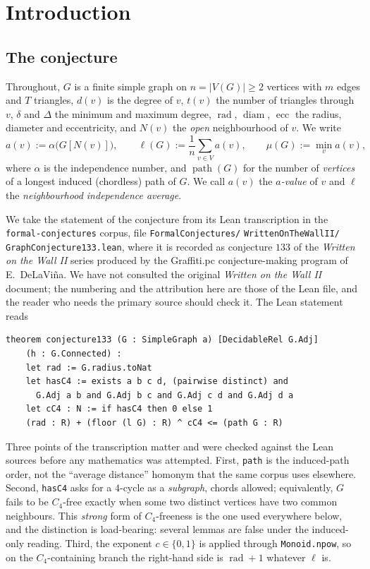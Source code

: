 \documentclass[11pt]{article}
\theoremstyle{plain}
\theoremstyle{definition}
\theoremstyle{remark}
\numberwithin{equation}{section}
\newcommand{\rad}{\operatorname{rad}}
\newcommand{\ecc}{\operatorname{ecc}}
\newcommand{\diam}{\operatorname{diam}}
\newcommand{\pth}{\operatorname{path}}
\begin{document}
\section{Introduction}\label{sec:intro}

\subsection{The conjecture}

Throughout, $G$ is a finite simple graph on $n = |V(G)| \ge 2$ vertices with $m$ edges and
$T$ triangles, $d(v)$ is the degree of $v$, $t(v)$ the number of triangles through $v$,
$\delta$ and $\Delta$ the minimum and maximum degree, $\rad$, $\diam$, $\ecc$ the radius,
diameter and eccentricity, and $N(v)$ the \emph{open} neighbourhood of $v$. We write
\[
  a(v) := \alpha\bigl(G[N(v)]\bigr), \qquad
  \ell(G) := \frac1n \sum_{v \in V} a(v), \qquad
  \mu(G) := \min_{v} a(v),
\]
where $\alpha$ is the independence number, and $\pth(G)$ for the number of \emph{vertices} of
a longest induced (chordless) path of $G$. We call $a(v)$ the \emph{$a$-value} of $v$ and
$\ell$ the \emph{neighbourhood independence average}.

We take the statement of the conjecture from its Lean transcription in the
\texttt{formal-conjectures} corpus, file
\texttt{FormalConjectures/} \texttt{WrittenOnTheWallII/} \texttt{GraphConjecture133.lean},
where it is recorded as conjecture $133$ of the \emph{Written on the Wall II} series produced by the Graffiti.pc
conjecture-making program of E.~DeLaVi\~na. We have not consulted the original \emph{Written
on the Wall II} document; the numbering and the attribution here are those of the Lean file,
and the reader who needs the primary source should check it. The Lean statement reads

\begin{verbatim}
theorem conjecture133 (G : SimpleGraph a) [DecidableRel G.Adj]
    (h : G.Connected) :
    let rad := G.radius.toNat
    let hasC4 := exists a b c d, (pairwise distinct) and
      G.Adj a b and G.Adj b c and G.Adj c d and G.Adj d a
    let cC4 : N := if hasC4 then 0 else 1
    (rad : R) + (floor (l G) : R) ^ cC4 <= (path G : R)
\end{verbatim}

Three points of the transcription matter and were checked against the Lean sources before any
mathematics was attempted. First, \texttt{path} is the induced-path order, not the
``average distance'' homonym that the same corpus uses elsewhere. Second, \texttt{hasC4} asks
for a $4$-cycle as a \emph{subgraph}, chords allowed; equivalently, $G$ fails to be
$C_4$-free exactly when some two distinct vertices have two common neighbours. This
\emph{strong} form of $C_4$-freeness is the one used everywhere below, and the distinction is
load-bearing: several lemmas are false under the induced-only reading. Third, the exponent
$c \in \{0,1\}$ is applied through \texttt{Monoid.npow}, so on the $C_4$-containing branch the
right-hand side is $\rad + 1$ whatever $\ell$ is.
\end{document}
